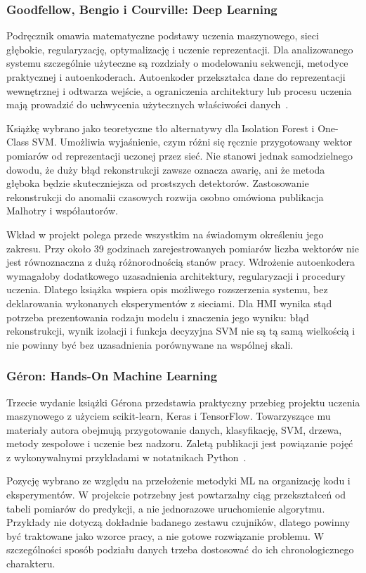 \documentclass[12pt,a4paper]{article}
\begin{document}
\subsubsection{Goodfellow, Bengio i Courville: Deep Learning}
Podręcznik omawia matematyczne podstawy uczenia maszynowego, sieci głębokie,
regularyzację, optymalizację i uczenie reprezentacji. Dla analizowanego
systemu szczególnie użyteczne są rozdziały o modelowaniu sekwencji,
metodyce praktycznej i autoenkoderach. Autoenkoder przekształca dane do
reprezentacji wewnętrznej i odtwarza wejście, a ograniczenia architektury
lub procesu uczenia mają prowadzić do uchwycenia użytecznych właściwości
danych~\cite{goodfellow2016}.

Książkę wybrano jako teoretyczne tło alternatywy dla Isolation Forest
i One-Class SVM. Umożliwia wyjaśnienie, czym różni się ręcznie przygotowany
wektor pomiarów od reprezentacji uczonej przez sieć. Nie stanowi jednak
samodzielnego dowodu, że duży błąd rekonstrukcji zawsze oznacza awarię,
ani że metoda głęboka będzie skuteczniejsza od prostszych detektorów.
Zastosowanie rekonstrukcji do anomalii czasowych rozwija osobno omówiona
publikacja Malhotry i współautorów.

Wkład w projekt polega przede wszystkim na świadomym określeniu jego zakresu.
Przy około 39 godzinach zarejestrowanych pomiarów liczba wektorów nie jest
równoznaczna z dużą różnorodnością stanów pracy. Wdrożenie autoenkodera
wymagałoby dodatkowego uzasadnienia architektury, regularyzacji i procedury
uczenia. Dlatego książka wspiera opis możliwego rozszerzenia systemu,
bez deklarowania wykonanych eksperymentów z sieciami. Dla HMI wynika stąd
potrzeba prezentowania rodzaju modelu i znaczenia jego wyniku: błąd
rekonstrukcji, wynik izolacji i funkcja decyzyjna SVM nie są tą samą wielkością
i nie powinny być bez uzasadnienia porównywane na wspólnej skali.

\subsubsection{Géron: Hands-On Machine Learning}
Trzecie wydanie książki Gérona przedstawia praktyczny przebieg projektu
uczenia maszynowego z użyciem scikit-learn, Keras i TensorFlow. Towarzyszące
mu materiały autora obejmują przygotowanie danych, klasyfikację, SVM,
drzewa, metody zespołowe i uczenie bez nadzoru. Zaletą publikacji jest
powiązanie pojęć z wykonywalnymi przykładami w notatnikach
Python~\cite{geron2022}.

Pozycję wybrano ze względu na przełożenie metodyki ML na organizację kodu
i eksperymentów. W projekcie potrzebny jest powtarzalny ciąg przekształceń
od tabeli pomiarów do predykcji, a nie jednorazowe uruchomienie algorytmu.
Przykłady nie dotyczą dokładnie badanego zestawu czujników, dlatego powinny
być traktowane jako wzorce pracy, a nie gotowe rozwiązanie problemu.
W szczególności sposób podziału danych trzeba dostosować do ich
chronologicznego charakteru.
\end{document}
